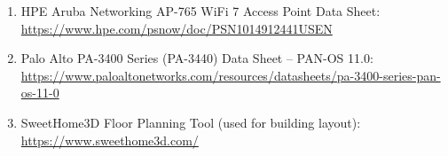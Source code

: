 \documentclass[12pt,a4paper]{report}
\begin{document}
\begin{enumerate}
  \item HPE Aruba Networking AP-765 WiFi 7 Access Point Data Sheet:\\
    \url{https://www.hpe.com/psnow/doc/PSN1014912441USEN}

  \item Palo Alto PA-3400 Series (PA-3440) Data Sheet -- PAN-OS 11.0:\\
    \url{https://www.paloaltonetworks.com/resources/datasheets/pa-3400-series-pan-os-11-0}

  \item SweetHome3D Floor Planning Tool (used for building layout):\\
    \url{https://www.sweethome3d.com/}

\end{enumerate}
\end{document}
